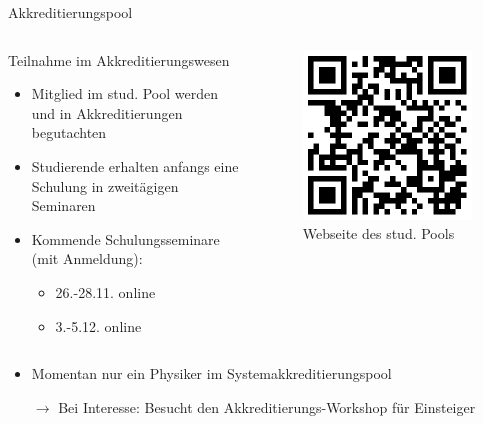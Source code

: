 \documentclass[compress, aspectratio=169]{beamer}
\begin{document}
\begin{frame}{Akkreditierungspool}
  \begin{columns}
    \begin{column}{0.85\textwidth}
      Teilnahme im Akkreditierungswesen
      \begin{itemize}
          \item Mitglied im stud. Pool werden und in Akkreditierungen begutachten
          \item Studierende erhalten anfangs eine Schulung in zweitägigen Seminaren
          \item Kommende Schulungsseminare (mit Anmeldung):
          \begin{itemize}
              \item 26.-28.11. online
              \item 3.-5.12. online
          \end{itemize}
        \end{itemize}
    \end{column}
    \begin{column}{0.15\textwidth}
      \begin{figure}
        \centering
        \includegraphics[width=\textwidth]{img/pool_qrcode.png}
        \caption*{Webseite des stud. Pools}
      \end{figure}
    \end{column}
  \end{columns}
    \vspace{0.5cm}
    \begin{itemize}
        \item Momentan nur ein Physiker im Systemakkreditierungspool
        \item[$\rightarrow$] Bei Interesse: Besucht den Akkreditierungs-Workshop für Einsteiger
    \end{itemize}
\end{frame}
\end{document}

